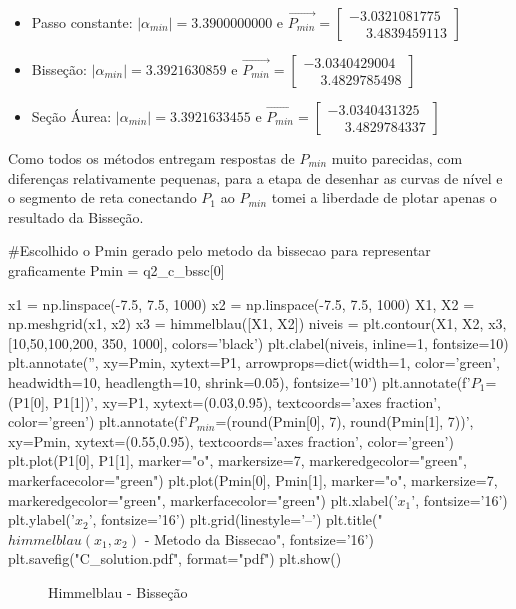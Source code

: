 \documentclass[10pt, a4paper]{article}
\begin{document}
\begin{itemize}
  \item Passo constante: $|\alpha_{min}| = 3.3900000000$ e $\overrightarrow{P_{min}} =  
  \begin{bmatrix}
    -3.0321081775 \\ \phantom{-}3.4839459113
  \end{bmatrix}$
  \item Bisseção: $|\alpha_{min}| = 3.3921630859$ e $\overrightarrow{P_{min}} =  
  \begin{bmatrix}
    -3.0340429004 \\ \phantom{-}3.4829785498
  \end{bmatrix}$
  \item Seção Áurea: $|\alpha_{min}| = 3.3921633455$ e $\overrightarrow{P_{min}} =  
  \begin{bmatrix}
    -3.0340431325 \\ \phantom{-}3.4829784337
  \end{bmatrix}$
\end{itemize}

Como todos os métodos entregam respostas de $P_{min}$ muito parecidas, com diferenças relativamente pequenas,
para a etapa de desenhar as curvas de nível e o segmento de reta conectando $P_1$ ao $P_{min}$ tomei a liberdade
de plotar apenas o resultado da Bisseção.

\begin{python}
  #Escolhido o Pmin gerado pelo metodo da bissecao para representar graficamente
  Pmin = q2_c_bssc[0]

  x1 = np.linspace(-7.5, 7.5, 1000)
  x2 = np.linspace(-7.5, 7.5, 1000)
  X1, X2 = np.meshgrid(x1, x2)
  x3 = himmelblau([X1, X2])
  niveis = plt.contour(X1, X2, x3, [10,50,100,200, 350, 1000], colors='black')
  plt.clabel(niveis, inline=1, fontsize=10)
  plt.annotate('', xy=Pmin, xytext=P1,
                  arrowprops=dict(width=1, color='green', headwidth=10, headlength=10, shrink=0.05), fontsize='10')
  plt.annotate(f'$P_1$=({P1[0]}, {P1[1]})', xy=P1, xytext=(0.03,0.95), textcoords='axes fraction', color='green')
  plt.annotate(f'$P_{{min}}$=({round(Pmin[0], 7)}, {round(Pmin[1], 7)})', xy=Pmin, xytext=(0.55,0.95), textcoords='axes fraction', color='green')
  plt.plot(P1[0], P1[1], marker="o", markersize=7, markeredgecolor="green", markerfacecolor="green")
  plt.plot(Pmin[0], Pmin[1], marker="o", markersize=7, markeredgecolor="green", markerfacecolor="green")
  plt.xlabel('$x_1$', fontsize='16')
  plt.ylabel('$x_2$', fontsize='16')
  plt.grid(linestyle='--')
  plt.title("$himmelblau(x_1, x_2)$ - Metodo da Bissecao", fontsize='16')
  plt.savefig("C_solution.pdf", format="pdf")
  plt.show()
\end{python}

\begin{figure}[htpb]
  \centering
  \caption{Himmelblau - Bisseção}
  \label{fig:q2c}
\end{figure}
\end{document}

